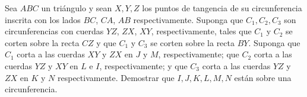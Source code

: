 Sea $ABC$ un triángulo y sean $X,Y,Z$ los puntos de tangencia de su circunferencia inscrita con los lados $BC$, $CA$, $AB$ respectivamente. Suponga que $C_1, C_2, C_3$ son circunferencias con cuerdas $YZ$, $ZX$, $XY$, respectivamente, tales que $C_1$ y $C_2$ se corten sobre la recta $CZ$ y que $C_1$ y $C_3$ se corten sobre la recta $BY$. Suponga que $C_1$ corta a las cuerdas $XY$ y $ZX$ en $J$ y $M$, respectivamente; que $C_2$ corta a las cuerdas $YZ$ y $XY$ en $L$ e $I$, respectivamente; y que $C_3$ corta a las cuerdas $YZ$ y $ZX$ en $K$ y $N$ respectivamente. Demostrar que $I,J,K,L,M,N$ están sobre una circunferencia.
